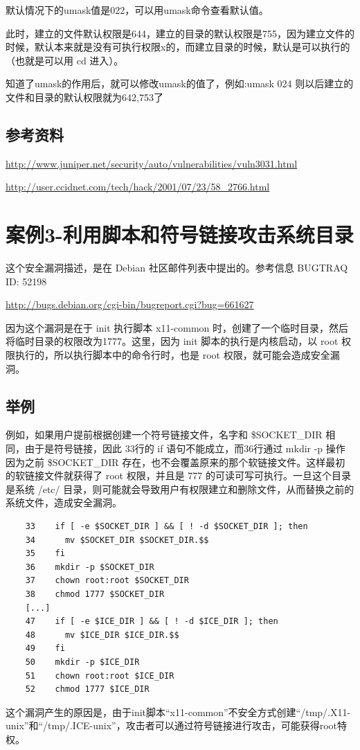 默认情况下的umask值是022，可以用umask命令查看默认值。

此时，建立的文件默认权限是644，建立的目录的默认权限是755，因为建立文件的时候，默认本来就是没有可执行权限x的，而建立目录的时候，默认是可以执行的（也就是可以用
cd 进入）。

知道了umask的作用后，就可以修改umask的值了，例如:umask 024
则以后建立的文件和目录的默认权限就为642,753了

\subsection{参考资料}

\url{http://www.juniper.net/security/auto/vulnerabilities/vuln3031.html}

\url{http://user.ccidnet.com/tech/hack/2001/07/23/58_2766.html}

\section{案例3-利用脚本和符号链接攻击系统目录}

这个安全漏洞描述，是在 Debian 社区邮件列表中提出的。参考信息 BUGTRAQ ID:
52198

\url{http://bugs.debian.org/cgi-bin/bugreport.cgi?bug=661627}

因为这个漏洞是在于 init 执行脚本 x11-common
时，创建了一个临时目录，然后将临时目录的权限改为1777。这里，因为 init
脚本的执行是内核启动，以 root 权限执行的，所以执行脚本中的命令行时，也是
root 权限，就可能会造成安全漏洞。

\subsection{举例}

例如，如果用户提前根据创建一个符号链接文件，名字和 \$SOCKET\_DIR
相同，由于是符号链接，因此 33行的 if 语句不能成立，而36行通过 mkdir -p
操作因为之前 \$SOCKET\_DIR
存在，也不会覆盖原来的那个软链接文件。这样最初的软链接文件就获得了 root
权限，并且是 777 的可读可写可执行。一旦这个目录是系统 /etc/
目录，则可能就会导致用户有权限建立和删除文件，从而替换之前的系统文件，造成安全漏洞。

{\begin{shaded}\begin{verbatim}
    33    if [ -e $SOCKET_DIR ] && [ ! -d $SOCKET_DIR ]; then
    34      mv $SOCKET_DIR $SOCKET_DIR.$$
    35    fi
    36    mkdir -p $SOCKET_DIR
    37    chown root:root $SOCKET_DIR
    38    chmod 1777 $SOCKET_DIR
    [...]
    47    if [ -e $ICE_DIR ] && [ ! -d $ICE_DIR ]; then
    48      mv $ICE_DIR $ICE_DIR.$$
    49    fi
    50    mkdir -p $ICE_DIR
    51    chown root:root $ICE_DIR
    52    chmod 1777 $ICE_DIR
\end{verbatim}\end{shaded}}
这个漏洞产生的原因是，由于init脚本``x11-common''不安全方式创建``/tmp/.X11-unix''和``/tmp/.ICE-unix''，攻击者可以通过符号链接进行攻击，可能获得root特权。

